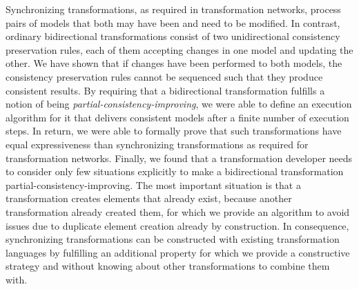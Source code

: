 \begin{insight}[Synchronization]
    Synchronizing transformations, as required in transformation networks, process pairs of models that both may have been and need to be modified.
    In contrast, ordinary bidirectional transformations consist of two unidirectional consistency preservation rules, each of them accepting changes in one model and updating the other.
    We have shown that if changes have been performed to both models, the consistency preservation rules cannot be sequenced such that they produce consistent results.
    By requiring that a bidirectional transformation fulfills a notion of being \emph{partial-consistency-improving}, we were able to define an execution algorithm for it that delivers consistent models after a finite number of execution steps.
    In return, we were able to formally prove that such transformations have equal expressiveness than synchronizing transformations as required for transformation networks. %
    Finally, we found that a transformation developer needs to consider only few situations explicitly to make a bidirectional transformation partial-consistency-improving. 
    The most important situation is that a transformation creates elements that already exist, because another transformation already created them, for which we provide an algorithm to avoid issues due to duplicate element creation already by construction.
    In consequence, synchronizing transformations can be constructed with existing transformation languages by fulfilling an additional property for which we provide a constructive strategy and without knowing about other transformations to combine them with.
\end{insight}

